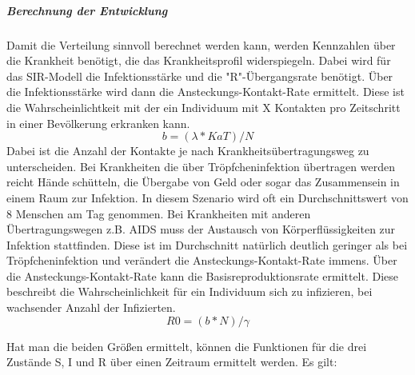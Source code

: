 \subparagraph{Berechnung der Entwicklung}
Damit die Verteilung sinnvoll berechnet werden kann, werden Kennzahlen über die Krankheit benötigt, die das Krankheitsprofil widerspiegeln. Dabei wird für das SIR-Modell die Infektionsstärke und die "R"-Übergangsrate benötigt.
Über die Infektionsstärke wird dann die Ansteckungs-Kontakt-Rate ermittelt. Diese ist die Wahrscheinlichtkeit mit der ein Individuum mit X Kontakten pro Zeitschritt in einer Bevölkerung erkranken kann.
\begin{equation}
b = ( \lambda * KaT) / N
\end{equation}
Dabei ist die Anzahl der Kontakte je nach Krankheitsübertragungsweg zu unterscheiden. Bei Krankheiten die über Tröpfcheninfektion übertragen werden reicht Hände schütteln, die Übergabe von Geld oder sogar das Zusammensein in einem Raum zur Infektion. In diesem Szenario wird oft ein Durchschnittswert von 8 Menschen am Tag genommen. Bei Krankheiten mit anderen Übertragungswegen z.B. AIDS muss der Austausch von Körperflüssigkeiten zur Infektion stattfinden. Diese ist im Durchschnitt natürlich deutlich geringer als bei Tröpfcheninfektion und verändert die Ansteckungs-Kontakt-Rate immens.
Über die Ansteckungs-Kontakt-Rate kann die Basisreproduktionsrate ermittelt. Diese beschreibt die Wahrscheinlichkeit für ein Individuum sich zu infizieren, bei wachsender Anzahl der Infizierten.
\begin{equation}
R0 = ( b * N ) / \gamma
\end{equation}

Hat man die beiden Größen ermittelt, können die Funktionen für die drei Zustände S, I und R über einen Zeitraum ermittelt werden. 
Es gilt:

\begin{equation}
\end{equation}


